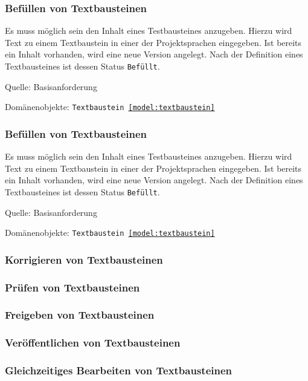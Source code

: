 \subsubsection{Befüllen von Textbausteinen}

Es muss möglich sein den Inhalt eines Testbausteines anzugeben. Hierzu wird Text zu einem Textbaustein in einer der Projektsprachen eingegeben. Ist bereits ein Inhalt vorhanden, wird eine neue Version angelegt. Nach der Definition eines Textbausteines ist dessen Status \texttt{Befüllt}.

\textsf{Quelle:} Basisanforderung

\textsf{Domänenobjekte:} \texttt{Textbaustein \ref{model:textbaustein}}

\subsubsection{Befüllen von Textbausteinen}

Es muss möglich sein den Inhalt eines Testbausteines anzugeben. Hierzu wird Text zu einem Textbaustein in einer der Projektsprachen eingegeben. Ist bereits ein Inhalt vorhanden, wird eine neue Version angelegt. Nach der Definition eines Textbausteines ist dessen Status \texttt{Befüllt}.

\textsf{Quelle:} Basisanforderung

\textsf{Domänenobjekte:} \texttt{Textbaustein \ref{model:textbaustein}}

\TODO

\subsubsection{Korrigieren von Textbausteinen}

\subsubsection{Prüfen von Textbausteinen}

\subsubsection{Freigeben von Textbausteinen}

\subsubsection{Veröffentlichen von Textbausteinen}

\subsubsection{Gleichzeitiges Bearbeiten von Textbausteinen}


